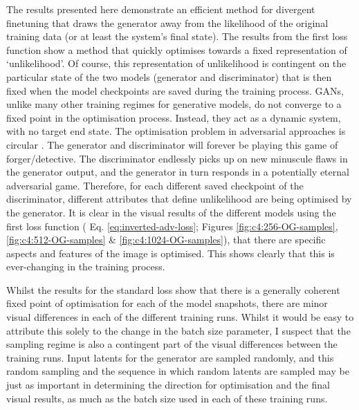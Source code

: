 The results presented here demonstrate an efficient method for divergent finetuning that draws the generator away from the likelihood of the original training data (or at least the system's final state). 
The results from the first loss function show a method that quickly optimises towards a fixed representation of `unlikelihood'.
Of course, this representation of unlikelihood is contingent on the particular state of the two models (generator and discriminator) that is then fixed when the model checkpoints are saved during the training process.
GANs, unlike many other training regimes for generative models,  do not converge to a fixed point in the optimisation process.
Instead, they act as a dynamic system, with no target end state. 
The optimisation problem in adversarial approaches is circular \citep{nagarajan2017gradient}. 
The generator and discriminator will forever be playing this game of forger/detective. 
The discriminator endlessly picks up on new minuscule flaws in the generator output, and the generator in turn responds in a potentially eternal adversarial game.
Therefore, for each different saved checkpoint of the discriminator, different attributes that define unlikelihood are being optimised by the generator.
It is clear in the visual results of the different models using the first loss function ( Eq. \ref{eq:inverted-adv-loss}; Figures \ref{fig:c4:256-OG-samples},\ref{fig:c4:512-OG-samples} \& \ref{fig:c4:1024-OG-samples}), that there are specific aspects and features of the image is optimised. 
This shows clearly that this is ever-changing in the training process.

Whilst the results for the standard loss show that there is a generally coherent fixed point of optimisation for each of the model snapshots, there are minor visual differences in each of the different training runs.
Whilst it would be easy to attribute this solely to the change in the batch size parameter, I suspect that the sampling regime is also a contingent part of the visual differences between the training runs.
Input latents for the generator are sampled randomly, and this random sampling and the sequence in which random latents are sampled may be just as important in determining the direction for optimisation and the final visual results, as much as the batch size used in each of these training runs. 

